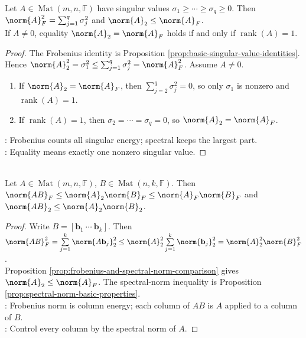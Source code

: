 \begin{proposition} \label{prop:frobenius-and-spectral-norm-comparison} \\
Let $A\in\operatorname{Mat}(m,n,\mathbb{F})$ have singular values $\sigma_1\geq\cdots\geq\sigma_q\geq0$. Then $\norm{A}_F^2=\sum_{j=1}^{q}\sigma_j^2$ and $\norm{A}_2\leq\norm{A}_F$.\\
If $A\neq0$, equality $\norm{A}_2=\norm{A}_F$ holds if and only if $\operatorname{rank}(A)=1$.
\begin{proof}
The Frobenius identity is Proposition \ref{prop:basic-singular-value-identities}. Hence $\norm{A}_2^2=\sigma_1^2\leq\sum_{j=1}^{q}\sigma_j^2=\norm{A}_F^2$. Assume $A\neq0$.
\begin{enumerate}[label=\roman*.]
\setlength{\itemsep}{0pt}
\item[$(\Rightarrow)$] If $\norm{A}_2=\norm{A}_F$, then $\sum_{j=2}^{q}\sigma_j^2=0$, so only $\sigma_1$ is nonzero and $\operatorname{rank}(A)=1$.
\item[$(\Leftarrow)$] If $\operatorname{rank}(A)=1$, then $\sigma_2=\cdots=\sigma_q=0$, so $\norm{A}_2=\norm{A}_F$.
\end{enumerate}
: Frobenius counts all singular energy; spectral keeps the largest part.\\
: Equality means exactly one nonzero singular value.
\end{proof}
\end{proposition}

\begin{theorem} \label{thm:frobenius-and-spectral-submultiplicativity} \\
Let $A\in\operatorname{Mat}(m,n,\mathbb{F})$, $B\in\operatorname{Mat}(n,k,\mathbb{F})$. Then $\norm{AB}_F\leq\norm{A}_2\norm{B}_F\leq\norm{A}_F\norm{B}_F$ and $\norm{AB}_2\leq\norm{A}_2\norm{B}_2$.
\begin{proof}
Write $B=[\mathbf{b}_1\ \cdots\ \mathbf{b}_k]$. Then $\norm{AB}_F^2 =\sum\limits_{j=1}^{k}\norm{A\mathbf{b}_j}_2^2 \leq\norm{A}_2^2\sum\limits_{j=1}^{k}\norm{\mathbf{b}_j}_2^2 =\norm{A}_2^2\norm{B}_F^2$.\\
Proposition \ref{prop:frobenius-and-spectral-norm-comparison} gives $\norm{A}_2\leq\norm{A}_F$. The spectral-norm inequality is Proposition \ref{prop:spectral-norm-basic-properties}.\\
: Frobenius norm is column energy; each column of $AB$ is $A$ applied to a column of $B$.\\
: Control every column by the spectral norm of $A$.
\end{proof}
\end{theorem}

